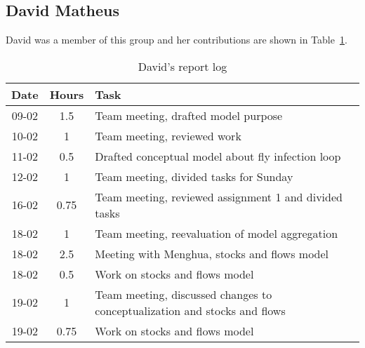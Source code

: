 \subsection{David Matheus}
David was a member of this group and her contributions are shown in Table~\ref{tab:david_log}. 
\begin{longtable}[c]{c|c|m{35em}}
\caption{David's report log}
\label{tab:david_log}\\
\textbf{Date}& \textbf{Hours} & \textbf{Task} \\
\hline
\endfirsthead
%
\endhead
%
09-02   &   1.5     &   Team meeting, drafted model purpose                                         \\
10-02   &   1       &   Team meeting, reviewed work                                                 \\
11-02   &   0.5     &   Drafted conceptual model about fly infection loop                           \\
12-02   &   1       &   Team meeting, divided tasks for Sunday                                      \\
16-02   &   0.75    &   Team meeting, reviewed assignment 1 and divided tasks                       \\
18-02   &   1       &   Team meeting, reevaluation of model aggregation                             \\
18-02   &   2.5     &   Meeting with Menghua, stocks and flows model                                \\
18-02   &   0.5     &   Work on stocks and flows model                                              \\
19-02   &   1       &   Team meeting, discussed changes to conceptualization and stocks and flows   \\
19-02   &   0.75    &   Work on stocks and flows model                                              \\
\end{longtable}